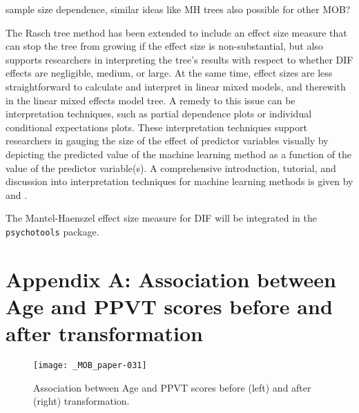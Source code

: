 \documentclass[doc,floatsintext,natbib]{apa7}
\begin{document}



sample size dependence, similar ideas like MH trees also possible for other MOB? 

The Rasch tree method has been extended to include an effect size measure that can stop the tree from growing if the effect size is non-substantial, but also supports researchers in interpreting the tree's results with respect to whether DIF effects are negligible, medium, or large. At the same time, effect sizes are less straightforward to calculate and interpret in linear mixed models, and therewith in the linear mixed effects model tree. A remedy to this issue can be interpretation techniques, such as partial dependence plots or individual conditional expectations plots. These interpretation techniques support researchers in gauging the size of the effect of predictor variables visually by depicting the predicted value of the machine learning method as a function of the value of the predictor variable(s). A comprehensive introduction, tutorial, and discussion into interpretation techniques for machine learning methods is given by \cite{Molnar2019} and \cite{Henninger2022c}. 

The Mantel-Haenszel effect size measure for DIF will be integrated in the \texttt{psychotools} package. 






\newpage
\appendix



\section{Appendix A: Association between Age and PPVT scores before and after transformation}
\label{sec:AppendixA}


\begin{figure}
\caption{Association between Age and PPVT scores before (left) and after (right) transformation.}
\texttt{[image: \_MOB\_paper-031]}
\end{figure}
\end{document}
